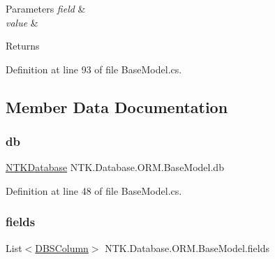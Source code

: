 \begin{DoxyParams}{Parameters}
{\em field} & \\
\hline
{\em value} & \\
\hline
\end{DoxyParams}
\begin{DoxyReturn}{Returns}

\end{DoxyReturn}


Definition at line 93 of file Base\+Model.\+cs.



\subsection{Member Data Documentation}
\mbox{\label{class_n_t_k_1_1_database_1_1_o_r_m_1_1_base_model_a6a7d6eaf7ae1fd93a652c835b3907398}} 
\subsubsection{\texorpdfstring{db}{db}}
{\footnotesize\ttfamily \mbox{\hyperlink{class_n_t_k_1_1_database_1_1_n_t_k_database}{N\+T\+K\+Database}} N\+T\+K.\+Database.\+O\+R\+M.\+Base\+Model.\+db\hspace{0.3cm}{\ttfamily [protected]}}



Definition at line 48 of file Base\+Model.\+cs.

\mbox{\label{class_n_t_k_1_1_database_1_1_o_r_m_1_1_base_model_add7958e53601b80ab0b4892c4169d9fd}} 
\subsubsection{\texorpdfstring{fields}{fields}}
{\footnotesize\ttfamily List$<$\mbox{\hyperlink{class_n_t_k_1_1_database_1_1_d_b_s_column}{D\+B\+S\+Column}}$>$ N\+T\+K.\+Database.\+O\+R\+M.\+Base\+Model.\+fields\hspace{0.3cm}{\ttfamily [protected]}}




